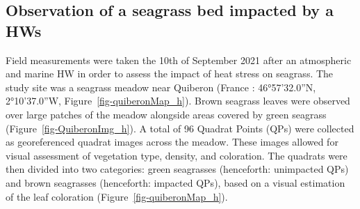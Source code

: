 \documentclass[
  letterpaper,
  11pt,
  english,
  singlespacing,
  headsepline]{MastersDoctoralThesis}
\begin{document}
\begin{spacing}{1.5}
\begin{figure}
\end{figure}%

\subsection{Observation of a seagrass bed impacted by a
HWs}\label{observation-of-a-seagrass-bed-impacted-by-a-hws}

Field measurements were taken the 10th of September 2021 after an
atmospheric and marine HW in order to assess the impact of heat stress
on seagrass. The study site was a seagrass meadow near Quiberon (France
: 46°57'32.0''N, 2°10'37.0''W, Figure~\ref{fig-quiberonMap_h}). Brown
seagrass leaves were observed over large patches of the meadow alongside
areas covered by green seagrass (Figure~\ref{fig-QuiberonImg_h}). A
total of 96 Quadrat Points (QPs) were collected as georeferenced quadrat
images across the meadow. These images allowed for visual assessment of
vegetation type, density, and coloration. The quadrats were then divided
into two categories: green seagrasses (henceforth: unimpacted QPs) and
brown seagrasses (henceforth: impacted QPs), based on a visual
estimation of the leaf coloration (Figure~\ref{fig-quiberonMap_h}).

\begin{figure}

\end{figure}
\end{spacing}
\end{document}
